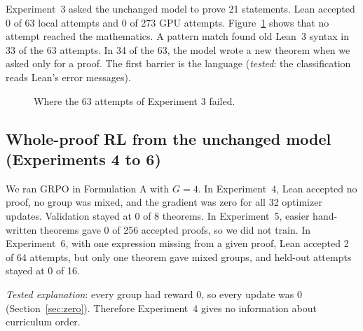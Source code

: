 \documentclass[11pt]{article}
\newcommand{\code}[1]{\texttt{#1}}
\begin{document}
Experiment~3 asked the unchanged model to prove 21 statements.
Lean accepted 0 of 63 local attempts and 0 of 273 GPU attempts.
Figure~\ref{fig:exp3} shows that no attempt reached the mathematics.
A pattern match found old Lean~3 syntax in 33 of the 63 attempts.
In 34 of the 63, the model wrote a new theorem when we asked only for a proof.
The first barrier is the language (\emph{tested}: the classification reads Lean's error messages).

\begin{figure}[!htbp]
\centering
{}
\caption{Where the 63 attempts of Experiment 3 failed.}
\label{fig:exp3}
\end{figure}

\subsection{Whole-proof RL from the unchanged model (Experiments 4 to 6)}
\label{sec:terminal}
We ran GRPO in Formulation A with $G = 4$.
In Experiment~4, Lean accepted no proof, no group was mixed, and the gradient was zero for all 32 optimizer updates.
Validation stayed at 0 of 8 theorems.
In Experiment~5, easier hand-written theorems gave 0 of 256 accepted proofs, so we did not train.
In Experiment~6, with one expression missing from a given proof, Lean accepted 2 of 64 attempts, but only one theorem gave mixed groups, and held-out attempts stayed at 0 of 16.

\emph{Tested explanation}: every group had reward 0, so every update was 0 (Section~\ref{sec:zero}).
Therefore Experiment~4 gives no information about curriculum order.
\end{document}
